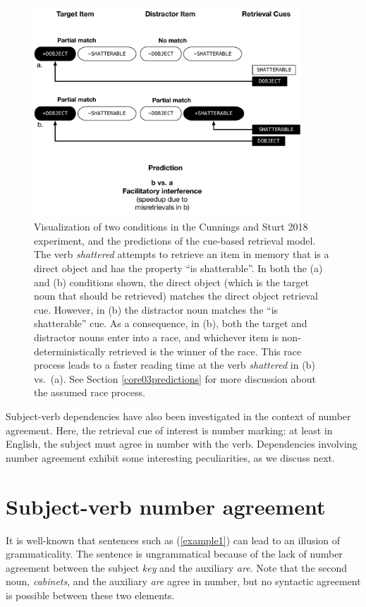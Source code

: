 \documentclass{cambridge7A}\usepackage[]{graphicx}\usepackage[]{color}
\begin{document}
 \begin{figure}[!htbp]
\centering
\includegraphics[width=10cm]{figures/c02cs2018implausible.pdf}
\caption{Visualization of two conditions in the Cunnings and Sturt 2018 experiment, and the predictions of the cue-based retrieval model. The verb \textit{shattered} attempts to retrieve an item in memory that is a direct object and has the property ``is shatterable''. In both the (a) and (b) conditions shown, the direct object (which is the  target noun that should be retrieved) matches the direct object retrieval cue. However, in (b) the distractor noun matches the ``is shatterable'' cue. As a consequence, in (b), both  the target and distractor nouns enter into a race, and whichever item is non-deterministically retrieved is the winner of the race. This race process leads to a faster reading time at the verb \textit{shattered} in (b) vs.\ (a). See Section \ref{core03predictions} for more discussion about the assumed race process.} \label{fig:cunningssturt}
\end{figure}

Subject-verb dependencies have also been investigated in the context of  number agreement. Here, the retrieval cue of interest is number marking: at least in English, the subject must agree in number with the verb. Dependencies involving number agreement exhibit some interesting peculiarities, as we discuss next.

\section{Subject-verb number agreement} 

It is well-known that sentences such as (\ref{example1}) 
can lead to an illusion of grammaticality.  The sentence is 
ungrammatical because of the lack of number agreement between 
the subject \textit{key} and the auxiliary \textit{are}.
Note that the second noun, \textit{cabinets}, and the auxiliary \textit{are} agree in number, but no syntactic agreement is possible between these two elements.
\end{document}
